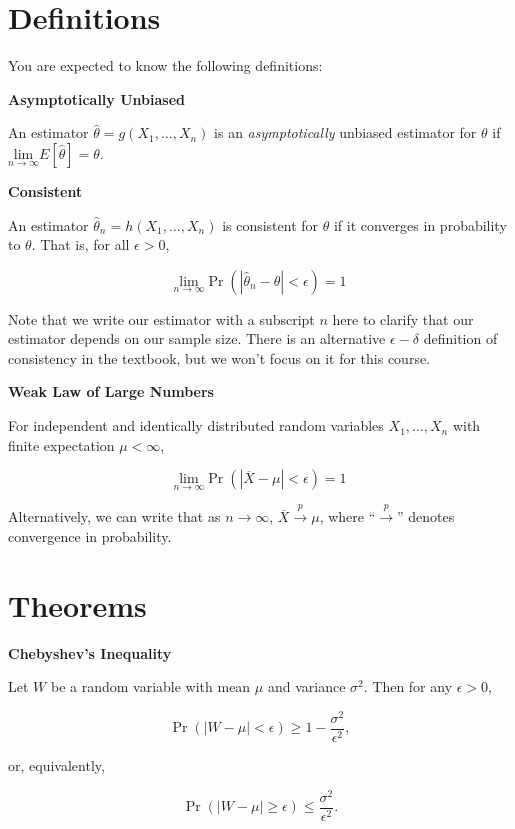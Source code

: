 \documentclass[
  letterpaper,
  DIV=11,
  numbers=noendperiod]{scrreprt}
\begin{document}
\section{Definitions}\label{definitions-4}

You are expected to know the following definitions:

\textbf{Asymptotically Unbiased}

An estimator \(\hat{\theta} = g(X_1, \dots, X_n)\) is an
\emph{asymptotically} unbiased estimator for \(\theta\) if
\(\underset{n \to \infty}{\text{lim}} E[\hat{\theta}] = \theta\).

\textbf{Consistent}

An estimator \(\hat{\theta}_n = h(X_1, \dots, X_n)\) is consistent for
\(\theta\) if it converges in probability to \(\theta\). That is, for
all \(\epsilon > 0\),

\[
\underset{n \to \infty}{\text{lim}} \Pr(| \hat{\theta}_n - \theta | < \epsilon) = 1
\]

Note that we write our estimator with a subscript \(n\) here to clarify
that our estimator depends on our sample size. There is an alternative
\(\epsilon-\delta\) definition of consistency in the textbook, but we
won't focus on it for this course.

\textbf{Weak Law of Large Numbers}

For independent and identically distributed random variables
\(X_1, \dots, X_n\) with finite expectation \(\mu < \infty\),

\[
\underset{n \to \infty}{\text{lim}} \Pr(| \overline{X} - \mu | < \epsilon) = 1
\]

Alternatively, we can write that as \(n \to \infty\),
\(\overline{X} \overset{p}{\to} \mu\), where ``\(\overset{p}{\to}\)''
denotes convergence in probability.

\section{Theorems}\label{theorems-4}

\textbf{Chebyshev's Inequality}

Let \(W\) be a random variable with mean \(\mu\) and variance
\(\sigma^2\). Then for any \(\epsilon > 0\),

\[
\Pr(|W - \mu| < \epsilon) \geq 1 - \frac{\sigma^2}{\epsilon^2},
\]

or, equivalently,

\[
\Pr(|W - \mu| \geq \epsilon) \leq \frac{\sigma^2}{\epsilon^2}.
\]
\end{document}
